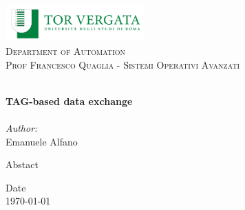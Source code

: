 \begin{titlepage}
\vbox{ }
\vbox{ }
\begin{center}
\includegraphics[width=0.40\textwidth]{Images/Logo-Universita-Roma-Tor-Vergata.png}\\[1cm]
\textsc{\LARGE Department of Automation}\\[1.5cm]
\textsc{\Large Prof Francesco Quaglia - Sistemi Operativi Avanzati}\\[0.5cm]
\vbox{ }

\HRule \\[0.4cm]
{ \huge \bfseries TAG-based data exchange}\\[0.4cm]
\HRule \\[1.5cm]

\large
\emph{Author:}\\
Emanuele Alfano

{Abstact}

\vfill



{Date\\ \large \today}

\end{center}
\end{titlepage}

